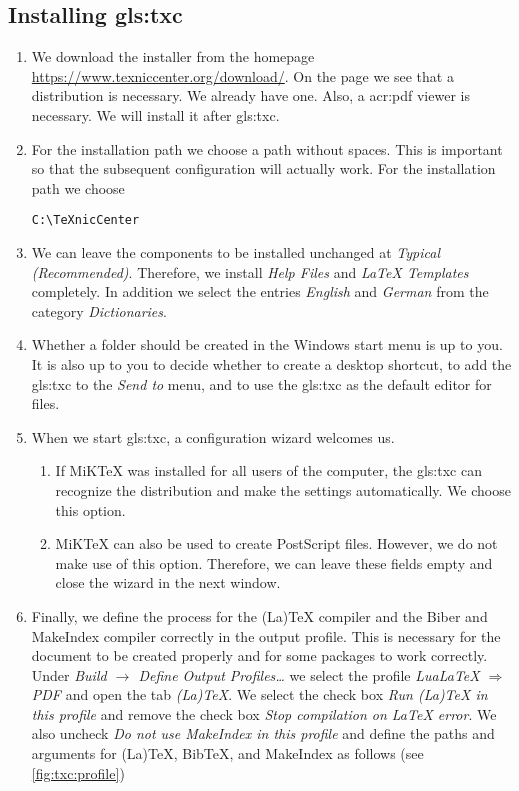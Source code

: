 \subsection{Installing \gls*{gls:txc}}
\label{sec:txc}
\begin{enumerate}
	\item We download the installer from the homepage \url{https://www.texniccenter.org/download/}. On the page we see that a \Latex distribution is necessary. We already have one. Also, a \ac{acr:pdf} viewer is necessary. We will install it after \gls{gls:txc}.
	\item For the installation path we choose a path without spaces. This is important so that the subsequent configuration will actually work. For the installation path we choose
	
	\begin{minipage}{\linewidth}
		\begin{lstlisting}[caption=Installation path for \gls{gls:txc}]
		C:\TeXnicCenter
		\end{lstlisting}
	\end{minipage}%
	\item We can leave the components to be installed unchanged at \textit{Typical (Recommended)}. Therefore, we install \textit{Help Files} and \textit{LaTeX Templates} completely. In addition we select the entries \textit{English} and \textit{German} from the category \textit{Dictionaries}.
	\item Whether a folder should be created in the Windows start menu is up to you. It is also up to you to decide whether to create a desktop shortcut, to add the \gls{gls:txc} to the \textit{Send to} menu, and to use the \gls{gls:txc} as the default editor for \Latex files.
	\item When we start \gls{gls:txc}, a configuration wizard welcomes us.
	\begin{enumerate}
		\item If MiKTeX was installed for all users of the computer, the \gls{gls:txc} can recognize the distribution and make the settings automatically. We choose this option.
		\item MiKTeX can also be used to create PostScript files. However, we do not make use of this option. Therefore, we can leave these fields empty and close the wizard in the next window.
	\end{enumerate} 
	\item Finally, we define the process for the (La)TeX compiler and the Biber and MakeIndex compiler correctly in the output profile. This is necessary for the document to be created properly and for some packages to work correctly. Under \textit{Build $\rightarrow$ Define Output Profiles\ldots} we select the profile \textit{LuaLaTeX $\Rightarrow$ PDF} and open the tab \textit{(La)TeX}. We select the check box \textit{Run (La)TeX in this profile} and remove the check box \textit{Stop compilation on LaTeX error}. We also uncheck \textit{Do not use MakeIndex in this profile} and define the paths and arguments for (La)TeX, BibTeX, and MakeIndex as follows (see \autoref{fig:txc:profile})
	

\end{enumerate}
